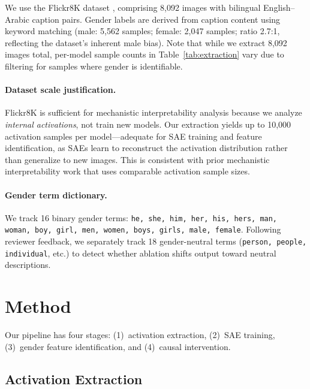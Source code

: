 \documentclass[11pt,a4paper]{article}
\newcommand{\sae}{SAE}
\begin{document}
We use the Flickr8K dataset \citep{hodosh2013framing}, comprising 8,092 images with bilingual English--Arabic caption pairs.
Gender labels are derived from caption content using keyword matching (male: 5,562 samples; female: 2,047 samples; ratio 2.7:1, reflecting the dataset's inherent male bias).
Note that while we extract 8,092 images total, per-model sample counts in Table~\ref{tab:extraction} vary due to filtering for samples where gender is identifiable.

\paragraph{Dataset scale justification.}
Flickr8K is sufficient for mechanistic interpretability analysis because we analyze \emph{internal activations}, not train new models.
Our extraction yields up to 10,000 activation samples per model---adequate for SAE training and feature identification, as SAEs learn to reconstruct the activation distribution rather than generalize to new images.
This is consistent with prior mechanistic interpretability work \citep{cunningham2023sparse,bricken2023monosemanticity} that uses comparable activation sample sizes.

\paragraph{Gender term dictionary.}
We track 16 binary gender terms: \texttt{he, she, him, her, his, hers, man, woman, boy, girl, men, women, boys, girls, male, female}.
Following reviewer feedback, we separately track 18 gender-neutral terms (\texttt{person, people, individual}, etc.) to detect whether ablation shifts output toward neutral descriptions.

\section{Method}
\label{sec:method}

Our pipeline has four stages: (1)~activation extraction, (2)~\sae{} training, (3)~gender feature identification, and (4)~causal intervention.

\subsection{Activation Extraction}
\end{document}
